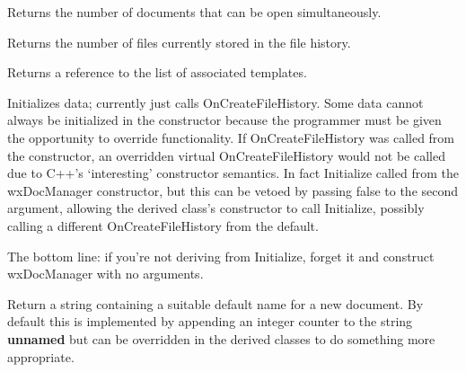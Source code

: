 \label{wxdocmanagergetmaxdocsopen}


Returns the number of documents that can be open simultaneously.


\label{wxdocmanagergethistoryfilescount}


Returns the number of files currently stored in the file history.


\label{wxdocmanagergettemplates}


Returns a reference to the list of associated templates.


\label{wxdocmanagerinitialize}


Initializes data; currently just calls OnCreateFileHistory. Some data cannot
always be initialized in the constructor because the programmer must be given
the opportunity to override functionality. If OnCreateFileHistory was called
from the constructor, an overridden virtual OnCreateFileHistory would not be
called due to C++'s `interesting' constructor semantics. In fact Initialize
 called from the wxDocManager constructor, but this can be
vetoed by passing false to the second argument, allowing the derived class's
constructor to call Initialize, possibly calling a different OnCreateFileHistory
from the default.

The bottom line: if you're not deriving from Initialize, forget it and
construct wxDocManager with no arguments.


\label{wxdocmanagermakenewdocumentname}


Return a string containing a suitable default name for a new document. By
default this is implemented by appending an integer counter to the string
{\bf unnamed} but can be overridden in the derived classes to do something more
appropriate.


\label{wxdocmanageroncreatefilehistory}


